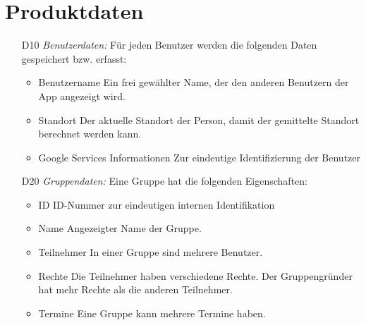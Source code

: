 \documentclass{scrartcl}
\begin{document}
	
	\newpage
	
	
	\section{Produktdaten}
	\begin{itemize}
		\item [D10] \textit{Benutzerdaten:}
		Für jeden Benutzer werden die folgenden Daten gespeichert bzw. erfasst:
		\begin{itemize}
			\item Benutzername
			\newline Ein frei gewählter Name, der den anderen Benutzern der App angezeigt wird.
			\item Standort
			\newline Der aktuelle Standort der Person, damit der gemittelte Standort berechnet werden kann.
			\item Google Services Informationen
			\newline Zur eindeutige Identifizierung der Benutzer
		\end{itemize}
		
		\item [D20] \textit{Gruppendaten:}
		Eine Gruppe hat die folgenden Eigenschaften:
		\begin{itemize}
			\item ID
			\newline ID-Nummer zur eindeutigen internen Identifikation
			\item Name
			\newline Angezeigter Name der Gruppe.
			\item Teilnehmer
			\newline In einer Gruppe sind mehrere Benutzer.
			\item Rechte
			\newline Die Teilnehmer haben verschiedene Rechte. Der Gruppengründer hat mehr Rechte als die anderen Teilnehmer.
			\item Termine
			\newline Eine Gruppe kann mehrere Termine haben.
		\end{itemize}
		

\end{itemize}
\end{document}
